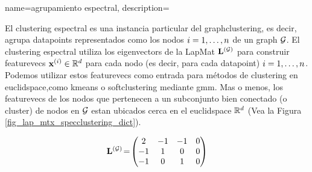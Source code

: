 {{
{name={agrupamiento espectral},
	description={El \gls{clustering} espectral  es una instancia particular del 
		\gls{graphclustering}, es decir, agrupa \gls{datapoint}s 
		representados como los nodos $i=1,\ldots,n$ de un \gls{graph} $\mathcal{G}$. 
		El \gls{clustering} espectral utiliza los \gls{eigenvector}s de la \gls{LapMat} ${\bf L}^{(\mathcal{G})}$ 
		para construir \gls{featurevec}s ${\bf x}^{(i)} \in \mathbb{R}^{d}$ 
		para cada nodo (es decir, para cada \gls{datapoint}) $i=1,\ldots,n$. Podemos utilizar estos \gls{featurevec}s 
		como entrada para métodos de \gls{clustering} en \gls{euclidspace},como \gls{kmeans} 
		o \gls{softclustering} mediante \gls{gmm}. Mas o menos, los \gls{featurevec}s de los nodos 
		que pertenecen a un subconjunto bien conectado (o \gls{cluster}) de nodos en $\mathcal{G}$ estan ubicados 
		cerca en el \gls{euclidspace} $\mathbb{R}^{d}$ (Vea la Figura \ref{fig_lap_mtx_specclustering_dict}). 
		\begin{figure}[H]
			\begin{center}
				\begin{minipage}{0.4\textwidth}
				\end{minipage} 
				\hspace*{5mm}
				\begin{minipage}{0.4\textwidth}
					\begin{equation} 
						{\bf L}^{(\mathcal{G})}\!=\!
						\begin{pmatrix} 
							2 & -1 & -1 & 0 \\ 
							-1 & 1 & 0 & 0 \\  
							-1 & 0 & 1 & 0 \\ 

\end{pmatrix}
\end{equation}
\end{minipage}
\end{center}
\end{figure}}}}}
